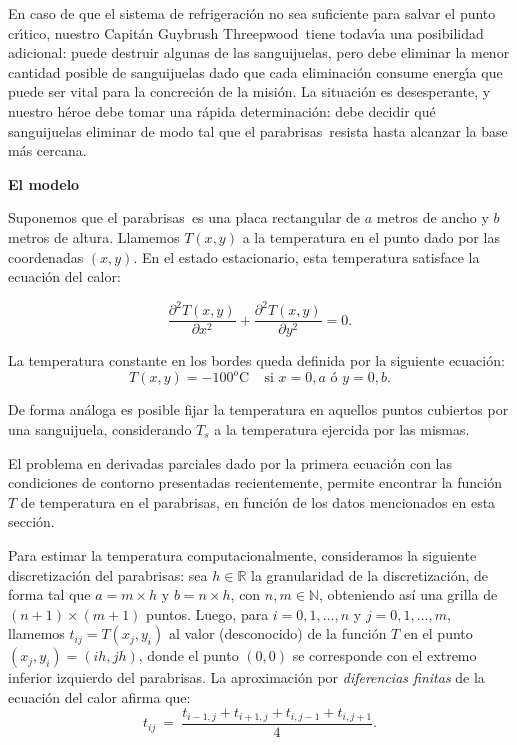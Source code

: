 \documentclass[double, 1.5in, 12pt]{beavtex}
\newcommand{\atacante}{sanguijuela}
\newcommand{\capitan}{Capit\'an Guybrush Threepwood}
\newcommand{\objeto}{parabrisas}
\begin{document}
En caso de que el sistema de refrigeraci\'on no sea suficiente para salvar
el punto cr\'\i tico, nues\-tro \capitan\ tiene todav\'\i a una posibilidad
adicional: puede des\-tru\-ir algunas de las \atacante s, pero debe eliminar la
menor cantidad posible de \atacante s dado que cada eliminaci\'on consume
energ\'\i a que puede ser vital para la concreci\'on de la misi\'on.
La situaci\'on es desesperante, y nuestro h\'eroe debe tomar una r\'apida
determinaci\'on: debe decidir qu\'e \atacante s eliminar de modo tal que el
\objeto\ resista hasta alcanzar la base m\'as cercana.

{\noindent \bf El modelo}

Suponemos que el \objeto\ es una placa rectangular de $a$ metros de ancho y $b$ metros de altura. Llamemos $T(x,y)$ a la temperatura en el punto dado por las coordenadas $(x,y)$. En el estado estacionario, esta temperatura satisface la ecuaci\'on del calor:

\begin{equation}\label{eq:calor}
\frac{\partial^2T(x,y)}{\partial x^{2}}+\frac{\partial^2 T(x,y)}{\partial y^{2}} = 0.
\end{equation}

\noindent La temperatura constante en los bordes queda definida por la siguiente ecuaci\'on:
\begin{equation}
T(x,y) = -100^o\textrm{C}~~~~~\textrm{si } x = 0,a \textrm{ \'o } y = 0,b.
\label{eq:borde}
\end{equation}

\noindent De forma an\'aloga es posible fijar la temperatura en aquellos puntos cubiertos por una \atacante, considerando $T_s$ a la temperatura ejercida por las mismas.

El problema en derivadas parciales dado por la primera ecuaci\'on con las condiciones de contorno presentadas recientemente, permite encontrar la funci\'on $T$ de temperatura en el \objeto, en funci\'on de los datos mencionados en esta secci\'on.

Para estimar la temperatura computacionalmente, con\-si\-de\-ra\-mos la siguiente discretizaci\'on del \objeto: sea $h \in \mathbb{R}$ la granularidad de la discretizaci\'on, de forma tal que $a = m\times h$ y $b = n \times h$, con $n,m \in \mathbb{N}$, obteniendo as\'i una grilla de $(n+1)\times(m+1)$ puntos. Luego, para $i=0,1,\dots,n$ y $j=0,1,\dots,m$, llamemos $t_{ij} = T(x_j,y_i)$ al valor (desconocido) de la funci\'on $T$ en el punto $(x_j, y_i) = (ih, jh)$, donde el punto $(0,0)$ se corresponde con el extremo inferior izquierdo del \objeto.
La aproximaci\'on por \emph{diferencias finitas} de la ecuaci\'on del calor afirma que:
\begin{equation}
t_{ij} \ =\ \frac{ t_{i-1,j} + t_{i+1,j} + t_{i,j-1} + t_{i,j+1}}{4}.\label{eq:calordd}
\end{equation}
\end{document}
